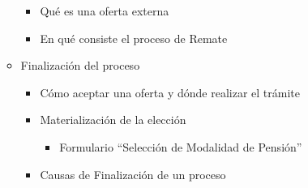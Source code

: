 \begin{enumerate}
\begin{itemize}
    \begin{itemize}
        \item Qué es una oferta externa
        \item En qué consiste el proceso de Remate   
    \end{itemize}
    \item Finalización del proceso
    \begin{itemize}
        \item Cómo aceptar una oferta y dónde realizar el trámite 
        \item Materialización de la elección 
        \begin{itemize}
            \item Formulario “Selección de Modalidad de Pensión” 
        \end{itemize}
        \item Causas de Finalización de un proceso 

    \end{itemize}
\end{itemize}




\end{enumerate}
